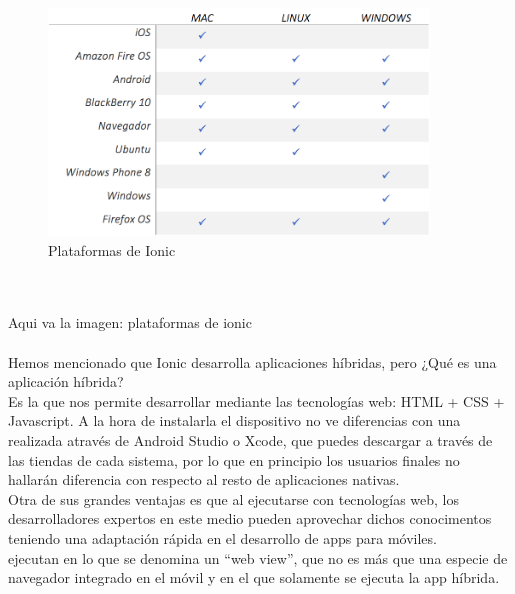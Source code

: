 \documentclass[a4paper, 11pt]{article}
\begin{document}
\begin{itemize}
                      \begin{figure}[H]
                        \centering
                        \includegraphics[width=0.9\textwidth]{tablaPlataformasIonic}
                        \caption{Plataformas de Ionic}
                        \label{f:plataformas}
                      \end{figure}
                      \\\\\textcolor[rgb]{1,0,0}{Aqui va la imagen: plataformas de ionic}\\\\

            Hemos mencionado que Ionic desarrolla aplicaciones híbridas, pero ¿Qué
            es una aplicación híbrida?\\

            Es la que nos permite desarrollar mediante las tecnologías web: HTML +
            CSS + Javascript. A la hora de instalarla el dispositivo no ve
            diferencias con una realizada através de Android Studio o Xcode, que
            puedes descargar a través de las tiendas de cada sistema, por lo que en
            principio los usuarios finales no hallarán diferencia con respecto al
            resto de aplicaciones nativas.\\

            Otra de sus grandes ventajas es que al ejecutarse con tecnologías web,
            los desarrolladores expertos en este medio pueden aprovechar dichos
            conocimentos teniendo una adaptación rápida en el desarrollo de apps
            para móviles.\\

            ejecutan en lo que se denomina un “web view”, que no es más que una
            especie de navegador integrado en el móvil y en el que solamente se
            ejecuta la app híbrida.\\


\end{itemize}
\end{document}
